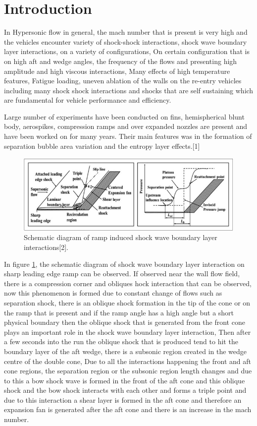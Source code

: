 \section{Introduction}
\label{sec:intro}
In Hypersonic flow in general, the mach number that is present is very high and the vehicles encounter variety of shock-shock interactions, shock wave boundary layer interactions, on a variety of configurations, On certain configuration that is on high aft and wedge angles, the frequency of the flows and presenting high amplitude and high viscous interactions, Many effects of high temperature features, Fatigue loading, uneven ablation of the walls on the re-entry vehicles including many shock shock interactions and shocks that are self sustaining which are fundamental for vehicle performance and efficiency.

Large number of experiments have been conducted on fins, hemispherical blunt body, aerospikes, compression ramps and over expanded nozzles are present and have been worked on for many years. Their main features was in the formation of separation bubble area variation and the entropy layer effects.[1]

\begin{figure}[ht]
\centering
  \includegraphics[width=0.8\linewidth]{images/photo.jpg}
  \caption{ Schematic diagram of ramp induced shock wave boundary layer interactions[2].}
  \label{fig:Schematic}
\end{figure}

In figure \ref{fig:Schematic}, the schematic diagram of shock wave boundary layer interaction on sharp leading edge ramp can be observed. If observed near the wall flow field, there is a compression corner and obliques hock interaction that can be observed, now this phenomenon is formed due to constant change of flows such as separation shock, there is an oblique shock formation in the tip of the cone or on the ramp that is present and if the ramp angle has a high angle but a short physical boundary then the oblique shock that is generated from the front cone plays an important role in the shock wave boundary layer interaction, Then after a few seconds into the run the oblique shock that is produced tend to hit the boundary layer of the aft wedge, there is a subsonic region created in the wedge centre of the double cone, Due to all the interactions happening the front and aft cone regions, the separation region or the subsonic region length changes and due to this a bow shock wave is formed in the front of the aft cone and this oblique shock and the bow shock interacts with each other and forms a triple point and due to this interaction a shear layer is formed in the aft cone and therefore an expansion fan is generated after the aft cone and there is an increase in the mach number. 